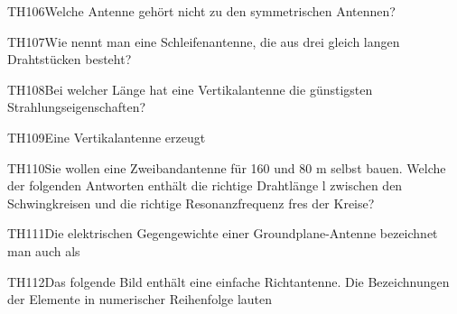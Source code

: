 \begin{question}{TH106}{Welche Antenne gehört nicht zu den symmetrischen Antennen?}
\end{question}

\begin{question}{TH107}{Wie nennt man eine Schleifenantenne, die aus drei gleich langen Drahtstücken besteht?}
\end{question}

\begin{question}{TH108}{Bei welcher Länge hat eine Vertikalantenne die günstigsten Strahlungseigenschaften?}
\end{question}

\begin{question}{TH109}{Eine Vertikalantenne erzeugt}
\end{question}

\begin{question}{TH110}{Sie wollen eine Zweibandantenne für 160 und 80 m selbst bauen. Welche der folgenden Antworten enthält die richtige Drahtlänge l zwischen den Schwingkreisen und die richtige Resonanzfrequenz fres der Kreise?}
\end{question}

\begin{question}{TH111}{Die elektrischen Gegengewichte einer Groundplane-Antenne bezeichnet man auch als}
\end{question}

\begin{question}{TH112}{Das folgende Bild enthält eine einfache Richtantenne. Die Bezeichnungen der Elemente in numerischer Reihenfolge lauten}
\end{question}

